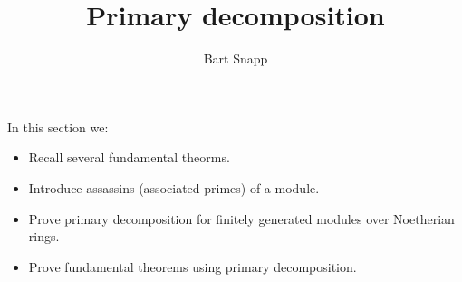 \documentclass{ximera}
\author{Bart Snapp}
\title{Primary decomposition}
\begin{document}
\begin{abstract}
\end{abstract}

\maketitle

In this section we:

\begin{itemize}
\item Recall several fundamental theorms.
\item Introduce assassins (associated primes) of a module.
\item Prove primary decomposition for finitely generated modules over
  Noetherian rings.
\item Prove fundamental theorems using primary decomposition.
\end{itemize}
\end{document}
